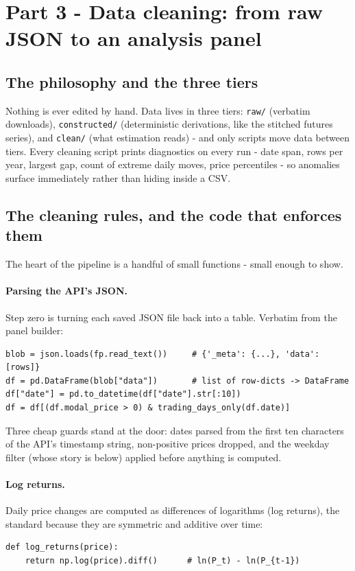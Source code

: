 \documentclass[11pt]{article}
\begin{document}
\section{Part 3 - Data cleaning: from raw JSON to an analysis panel}

\subsection{The philosophy and the three tiers}

Nothing is ever edited by hand. Data lives in three tiers: \texttt{raw/} (verbatim
downloads), \texttt{constructed/} (deterministic derivations, like the stitched futures
series), and \texttt{clean/} (what estimation reads) - and only scripts move data between
tiers. Every cleaning script prints diagnostics on every run - date span, rows per year,
largest gap, count of extreme daily moves, price percentiles - so anomalies surface
immediately rather than hiding inside a CSV.

\subsection{The cleaning rules, and the code that enforces them}

The heart of the pipeline is a handful of small functions - small enough to show.

\paragraph{Parsing the API's JSON.} Step zero is turning each saved JSON file back into
a table. Verbatim from the panel builder:
\begin{verbatim}
blob = json.loads(fp.read_text())     # {'_meta': {...}, 'data': [rows]}
df = pd.DataFrame(blob["data"])       # list of row-dicts -> DataFrame
df["date"] = pd.to_datetime(df["date"].str[:10])
df = df[(df.modal_price > 0) & trading_days_only(df.date)]
\end{verbatim}
Three cheap guards stand at the door: dates parsed from the first ten characters of the
API's timestamp string, non-positive prices dropped, and the weekday filter (whose story
is below) applied before anything is computed.

\paragraph{Log returns.} Daily price changes are computed as differences of logarithms
(log returns), the standard because they are symmetric and additive over time:
\begin{verbatim}
def log_returns(price):
    return np.log(price).diff()      # ln(P_t) - ln(P_{t-1})
\end{verbatim}
\end{document}
